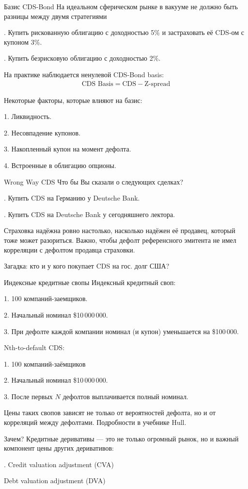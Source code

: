 \documentclass{beamer}
\begin{document}
\begin{frame}{Базис CDS-Bond}
\justify
На идеальном сферическом рынке в вакууме не должно быть разницы между двумя стратегиями

. Купить рискованную облигацию с доходностью 5\% и застраховать её CDS-ом с купоном 3\%.

. Купить безрисковую облигацию с доходностью 2\%.

\justify
На практике наблюдается ненулевой CDS-Bond basis:
\begin{align*}
\text{CDS Basis} = \text{CDS} - \text{Z-spread}
\end{align*}

\justify
Некоторые факторы, которые влияют на базис:

1. Ликвидность.

2. Несовпадение купонов.

3. Накопленный купон на момент дефолта.

4. Встроенные в облигацию опционы.
\end{frame}



\begin{frame}{Wrong Way CDS}
\justify
Что бы Вы сказали о следующих сделках?

. Купить CDS на Германию у Deutsche Bank.

. Купить CDS на Deutsche Bank у сегодняшнего лектора.

\justify
Страховка надёжна ровно настолько, насколько надёжен её продавец, который тоже может разориться. Важно, чтобы дефолт референсного эмитента не имел корреляции с дефолтом продавца страховки.

\justify
Загадка: кто и у кого покупает CDS на гос. долг США?
\end{frame}



\begin{frame}{Индексные кредитные свопы}
\justify
Индексный кредитный своп:

1. 100 компаний-заемщиков.

2. Начальный номинал \$10\,000\,000.

3. При дефолте каждой компании номинал (и купон) уменьшается на \$100\,000.

\justify
Nth-to-default CDS:

1. 100 компаний-заёмщиков

2. Начальный номинал \$10\,000\,000.

3. После первых $N$ дефолтов выплачивается полный номинал.

\justify
Цены таких свопов зависят не только от вероятностей дефолта, но и от корреляций между дефолтами. Подробности в учебнике Hull.
\end{frame}



\begin{frame}{Зачем?}
\justify
Кредитные деривативы --- это не только огромный рынок, но и важный компонент цены других деривативов:

. Credit valuation adjustment (CVA)

 Debt valuation adjustment (DVA)

\end{frame}
\end{document}
